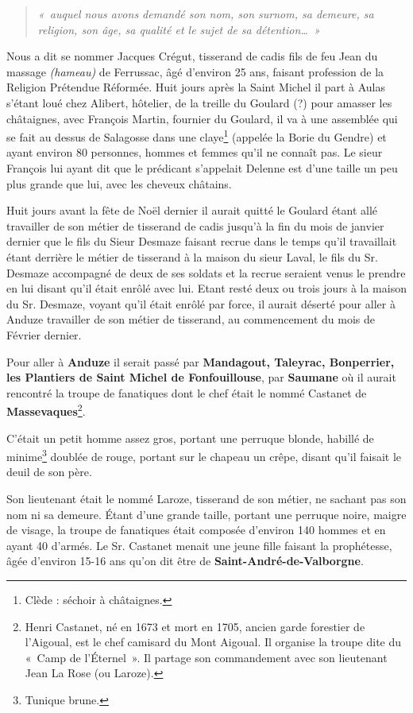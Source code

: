 \begin{quote}
\itshape
«~auquel nous avons demandé son nom, son surnom, sa demeure, sa religion, son âge, sa qualité et le sujet de sa détention…~»
\end{quote}

Nous a dit se nommer Jacques Crégut, tisserand de cadis fils de feu Jean du massage \textit{(hameau)} de Ferrussac, âgé d’environ 25 ans, faisant profession de la Religion Prétendue Réformée. Huit jours après la Saint Michel il part à Aulas s’étant loué chez Alibert, hôtelier, de la treille du Goulard (?) pour amasser les châtaignes, avec François Martin, fournier du Goulard, il va à une assemblée qui se fait au dessus de Salagosse dans une claye\footnote{Clède : séchoir à châtaignes.} (appelée la Borie du Gendre) et ayant environ 80 personnes, hommes et femmes qu’il ne connaît pas. Le sieur François lui ayant dit que le prédicant s’appelait Delenne est d’une taille un peu plus grande que lui, avec les cheveux châtains.

Huit jours avant la fête de Noël dernier il aurait quitté le Goulard étant allé travailler de son métier de tisserand de cadis jusqu’à la fin du mois de janvier dernier que le fils du Sieur Desmaze faisant recrue dans le temps qu’il travaillait étant derrière le métier de tisserand à la maison du sieur Laval, le fils du Sr. Desmaze accompagné de deux de ses soldats et la recrue seraient venus le prendre en lui disant qu’il était enrôlé avec lui. Etant resté deux ou trois jours à la maison du Sr. Desmaze, voyant qu’il était enrôlé par force, il aurait déserté pour aller à Anduze travailler de son métier de tisserand, au commencement du mois de Février dernier.

Pour aller à \textbf{Anduze} il serait passé par \textbf{Mandagout, Taleyrac, Bonperrier, les Plantiers de Saint Michel de Fonfouillouse}, par \textbf{Saumane} où il aurait rencontré la troupe de fanatiques dont le chef était le nommé Castanet de \textbf{Massevaques}\footnote{Henri Castanet, né en 1673 et mort en 1705, ancien garde forestier de l’Aigoual, est le chef camisard du Mont Aigoual. Il organise la troupe dite du «~Camp de l'Éternel~». Il partage son commandement avec son lieutenant Jean La Rose (ou Laroze).}.

C’était un petit homme assez gros, portant une perruque blonde, habillé de minime\footnote{Tunique brune.} doublée de rouge, portant sur le chapeau un crêpe, disant qu’il faisait le deuil de son père.

Son lieutenant était le nommé Laroze, tisserand de son métier, ne sachant pas son nom ni sa demeure. Étant d’une grande taille, portant une perruque noire, maigre de visage, la troupe de fanatiques était composée d’environ 140 hommes et en ayant 40 d’armés. Le Sr. Castanet menait une jeune fille faisant la prophétesse, âgée d’environ 15-16 ans qu’on dit être de \textbf{Saint-André-de-Valborgne}.

